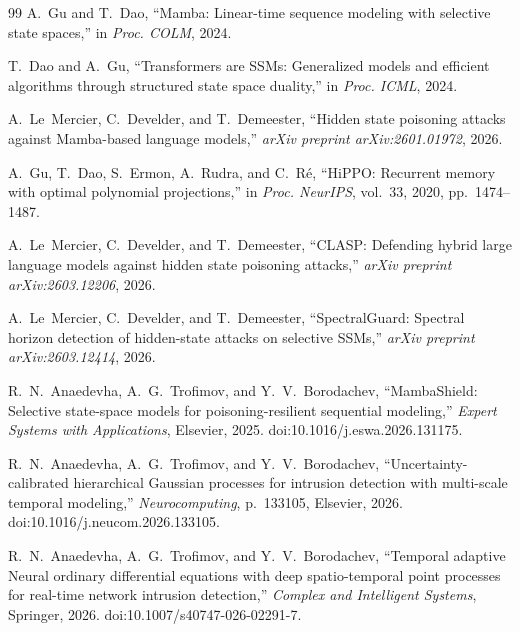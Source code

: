 \documentclass[journal,a4paper,10pt]{IEEEtran}
\theoremstyle{definition}
\theoremstyle{remark}
\begin{document}
\balance
\begin{thebibliography}{99}
A.~Gu and T.~Dao, ``{Mamba}: Linear-time sequence modeling with selective state spaces,'' in \emph{Proc. COLM}, 2024.

T.~Dao and A.~Gu, ``Transformers are SSMs: Generalized models and efficient algorithms through structured state space duality,'' in \emph{Proc. ICML}, 2024.

A.~Le~Mercier, C.~Develder, and T.~Demeester, ``Hidden state poisoning attacks against {Mamba}-based language models,'' \emph{arXiv preprint arXiv:2601.01972}, 2026.

A.~Gu, T.~Dao, S.~Ermon, A.~Rudra, and C.~R\'e, ``HiPPO: Recurrent memory with optimal polynomial projections,'' in \emph{Proc. NeurIPS}, vol.~33, 2020, pp.~1474--1487.

A.~Le~Mercier, C.~Develder, and T.~Demeester, ``{CLASP}: Defending hybrid large language models against hidden state poisoning attacks,'' \emph{arXiv preprint arXiv:2603.12206}, 2026.

A.~Le~Mercier, C.~Develder, and T.~Demeester, ``{SpectralGuard}: Spectral horizon detection of hidden-state attacks on selective SSMs,'' \emph{arXiv preprint arXiv:2603.12414}, 2026.

R.~N.~Anaedevha, A.~G.~Trofimov, and Y.~V.~Borodachev, ``{MambaShield}: Selective state-space models for poisoning-resilient sequential modeling,'' \emph{Expert Systems with Applications}, Elsevier, 2025. doi:10.1016/j.eswa.2026.131175.

R.~N.~Anaedevha, A.~G.~Trofimov, and Y.~V.~Borodachev, ``Uncertainty-calibrated hierarchical {Gaussian} processes for intrusion detection with multi-scale temporal modeling,'' \emph{Neurocomputing}, p.~133105, Elsevier, 2026. doi:10.1016/j.neucom.2026.133105.

R.~N.~Anaedevha, A.~G.~Trofimov, and Y.~V.~Borodachev, ``Temporal adaptive Neural ordinary differential equations with deep spatio-temporal point processes for real-time network intrusion detection,'' \emph{Complex and Intelligent Systems}, Springer, 2026. doi:10.1007/s40747-026-02291-7.


\end{thebibliography}
\end{document}
